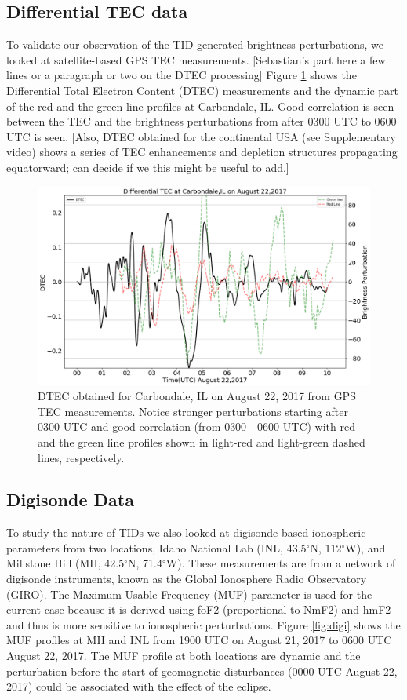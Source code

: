 \subsection{Differential TEC data}
To validate our observation of the TID-generated brightness perturbations, we looked at satellite-based GPS TEC measurements. [Sebastian's part here a few lines or a paragraph or two on the DTEC processing]
Figure \ref{fig:dtec_carb} shows the Differential Total Electron Content (DTEC) measurements and the dynamic part of the red and the green line profiles at Carbondale, IL. Good correlation is seen between the TEC and the brightness perturbations from after 0300 UTC to 0600 UTC is seen.
[Also, DTEC obtained for the continental USA  (see Supplementary video) shows a series of TEC enhancements and depletion structures propagating equatorward; can decide if we this might be useful to add.]


\begin{figure}
	\centering\includegraphics[width=35pc]{aug22_dtec_bper.png}
	\caption{DTEC obtained for Carbondale, IL on August 22, 2017 from GPS TEC measurements.  Notice stronger perturbations starting after 0300 UTC and good correlation (from 0300 - 0600 UTC) with red and the green line profiles  shown in light-red and light-green dashed lines, respectively. }
	\label{fig:dtec_carb}
\end{figure}
\subsection{Digisonde Data}
To study the nature of TIDs we also looked at digisonde-based ionospheric parameters from two locations, Idaho National Lab (INL, 43.5$^\circ$N, 112$^\circ$W), and Millstone Hill (MH, 42.5$^\circ$N, 71.4$^\circ$W). These measurements are from a network of digisonde instruments, known as the Global Ionosphere Radio Observatory (GIRO). The Maximum Usable Frequency (MUF) parameter is used for the current case because it is derived using foF2 (proportional to NmF2) and hmF2  and thus is more sensitive to ionospheric perturbations.
Figure \ref{fig:digi} shows the MUF profiles at MH and INL from 1900 UTC on August 21, 2017 to 0600 UTC August 22, 2017. The MUF profile at both locations are dynamic and the perturbation before the start of geomagnetic disturbances (0000 UTC August 22, 2017) could be associated with the effect of the eclipse.

